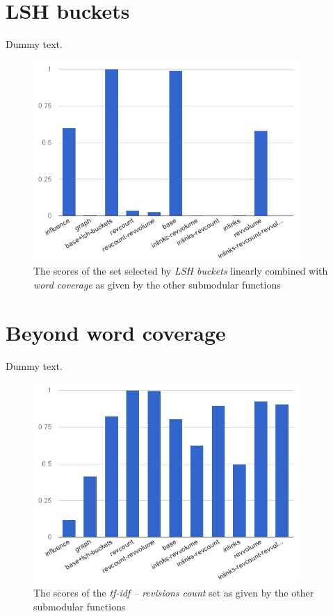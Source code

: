 \section{\ac{LSH} buckets}

Dummy text.
\begin{figure}
  \centering
  \includegraphics[width=0.9\textwidth,natwidth=555,natheight=419]{images/wc+lsh.png}
  \caption{The scores of the set selected by \emph{\ac{LSH} buckets} linearly
  combined with \emph{word coverage} as given by the other submodular
  functions}
  \label{img:wc+lsh}
\end{figure}

\section{Beyond word coverage}

Dummy text.
\begin{figure}
  \centering
  \includegraphics[width=0.9\textwidth,natwidth=555,natheight=419]{images/rc.png}
  \caption{The scores of the \emph{tf-idf -- revisions count} set as given by
  the other submodular functions}
  \label{img:rc}
\end{figure}

